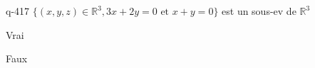 \begin{truefalse}{q-417}
$\{ (x,y,z) \in \mathbb R^3, 3x+2y=0\text{ et } x+y=0\}$ est un sous-ev de $\mathbb R^3$
\item* Vrai
\item Faux
\end{truefalse}

